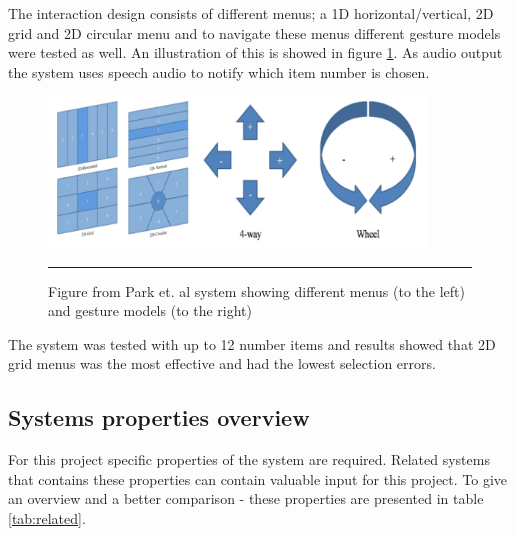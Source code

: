 The interaction design consists of different menus; a 1D horizontal/vertical, 2D grid and 2D circular menu and to navigate these menus different gesture models were tested as well. An illustration of this is showed in figure \ref{fig:park-menus}. As audio output the system uses speech audio to notify which item number is chosen.

\begin{figure}[htbp]
	\centering
		\includegraphics[width=0.9\textwidth,height=\textheight,keepaspectratio]{./Figures/park-menus.png}
		\rule{35em}{0.5pt}
	\caption[Park menus]{Figure from Park et. al \cite{park_gaze-directed_2011} system showing different menus (to the left) and gesture models (to the right)}
	\label{fig:park-menus}
\end{figure}

The system was tested with up to 12 number items and results showed that 2D grid menus was the most effective and had the lowest selection errors.


\subsection{Systems properties overview}
For this project specific properties of the system are required. Related systems that contains these properties can contain valuable input for this project. To give an overview and a better comparison - these properties are presented in table \ref{tab:related}.

